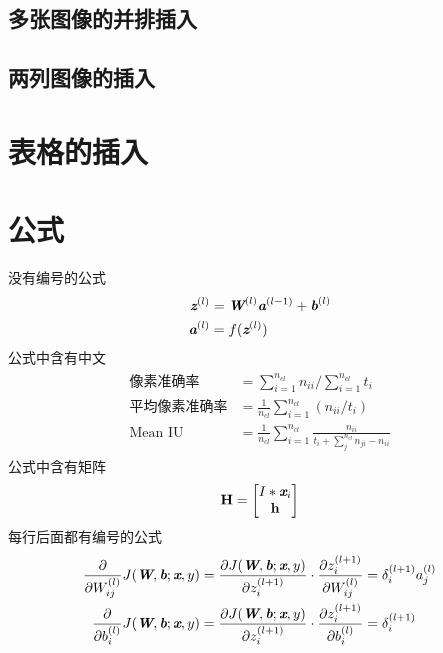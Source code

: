 \subsection{多张图像的并排插入}
\label{sub:多张图像的并排插入}



\subsection{两列图像的插入}
\label{sec:complex}


\clearpage

\section{表格的插入}
\label{sec:tables}



\section{公式}
\label{sec:formula}
没有编号的公式
\begin{align*}
\begin{split}
	\label{eq:feedforward}
	\textit{\textbf{z}}^{(l)} & = \textit{\textbf{W}}^{(l)}\textit{\textbf{a}}^{(l-1)} + \textit{\textbf{b}}^{(l)} \\
	\textit{\textbf{a}}^{(l)} & = f(\textit{\textbf{z}}^{(l)})
\end{split}
\end{align*}
公式中含有中文
\begin{align}
	\begin{split}
	\mbox{像素准确率} &= \sum_{i=1}^{n_{cl}}n_{ii} / \sum_{i=1}^{n_{cl}}t_i \\
		\mbox{平均像素准确率} &= \frac{1}{n_{cl}} \sum_{i=1}^{n_{cl}}(n_{ii}/ t_i) \\
	\mbox{Mean IU} &= \frac{1}{n_{cl}} \sum_{i=1}^{n_{cl}}\frac{n_{ii}}{t_i + \sum_j^{n_{cl}} n_{ji} - n_{ii}}
	\end{split}
\end{align}
公式中含有矩阵
\begin{equation}
	\textbf{H} = \begin{bmatrix}
		I*\textit{\textbf{x}}_i \\ \textbf{h}
	\end{bmatrix}
\end{equation}
每行后面都有编号的公式
\begin{align}
	\frac{\partial}{\partial W_{ij}^{(l)}} J(\textit{\textbf{W}},\textit{\textbf{b}};\textit{\textbf{x}},y) &= \frac{\partial J(\textit{\textbf{W}},\textit{\textbf{b}};\textit{\textbf{x}},y)}{\partial z_i^{(l+1)}}\cdot \frac{\partial z_i^{(l+1)}}{\partial W_{ij}^{(l)}} = \delta_i^{(l+1)}a_j^{(l)} \\
	\frac{\partial}{\partial b_i^{(l)}} J(\textit{\textbf{W}},\textit{\textbf{b}};\textit{\textbf{x}},y) &= \frac{\partial J(\textit{\textbf{W}},\textit{\textbf{b}};\textit{\textbf{x}},y)}{\partial z_i^{(l+1)}}\cdot \frac{\partial z_i^{(l+1)}}{\partial b_i^{(l)}} = \delta_i^{(l+1)}
\end{align}

